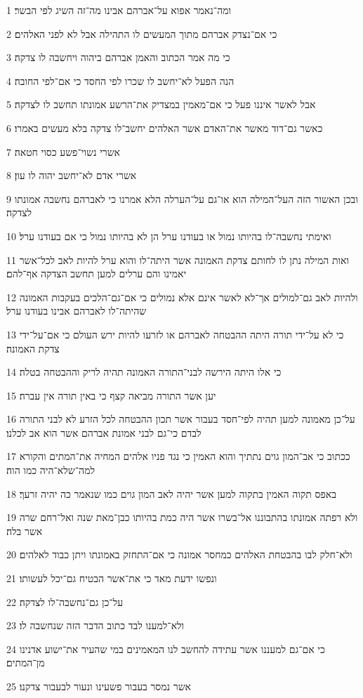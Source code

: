 \par 1 ומה־נאמר אפוא על־אברהם אבינו מה־זה השיג לפי הבשר׃
\par 2 כי אם־נצדק אברהם מתוך המעשים לו התהילה אבל לא לפני האלהים׃
\par 3 כי מה אמר הכתוב והאמן אברהם ביהוה ויחשבה לו צדקה׃
\par 4 הנה הפעל לא־יחשב לו שכרו לפי החסד כי אם־לפי החובה׃
\par 5 אבל לאשר איננו פעל כי אם־מאמין במצדיק את־הרשע אמונתו תחשב לו לצדקה׃
\par 6 כאשר גם־דוד מאשר את־האדם אשר האלהים יחשב־לו צדקה בלא מעשים באמרו׃
\par 7 אשרי נשוי־פשע כסוי חטאה׃
\par 8 אשרי אדם לא־יחשב יהוה לו עון׃
\par 9 ובכן האשור הזה העל־המילה הוא או־גם על־הערלה הלא אמרנו כי לאברהם נחשבה אמונתו לצדקה׃
\par 10 ואימתי נחשבה־לו בהיותו נמול או בעודנו ערל הן לא בהיותו נמול כי אם בעודנו ערל׃
\par 11 ואות המילה נתן לו לחותם צדקת האמונה אשר היתה־לו והוא ערל להיות לאב לכל־אשר יאמינו והם ערלים למען תחשב הצדקה אף־להם׃
\par 12 ולהיות לאב גם־למולים אך־לא לאשר אינם אלא נמולים כי אם־גם־הלכים בעקבות האמונה שהיתה־לו לאברהם אבינו בעודנו ערל׃
\par 13 כי לא על־ידי תורה היתה ההבטחה לאברהם או לזרעו להיות ירש העולם כי אם־על־ידי צדקת האמונה׃
\par 14 כי אלו היתה הירשה לבני־התורה האמונה תהיה לריק וההבטחה בטלה׃
\par 15 יען אשר התורה מביאה קצף כי באין תורה אין עברה׃
\par 16 על־כן מאמונה למען תהיה לפי־חסד בעבור אשר תכון ההבטחה לכל הזרע לא לבני התורה לבדם כי־גם לבני אמונת אברהם אשר הוא אב לכלנו׃
\par 17 ככתוב כי אב־המון גוים נתתיך והוא האמין כי נגד פניו אלהים המחיה את־המתים והקורא למה־שלא־היה כמו הוה׃
\par 18 באפס תקוה האמין בתקוה למען אשר יהיה לאב המון גוים כמו שנאמר כה יהיה זרעך׃
\par 19 ולא רפתה אמונתו בהתבוננו אל־בשרו אשר היה כמת בהיותו כבן־מאת שנה ואל־רחם שרה אשר בלה׃
\par 20 ולא־חלק לבו בהבטחת האלהים כמחסר אמונה כי אם־התחזק באמונתו ויתן כבוד לאלהים׃
\par 21 ונפשו ידעת מאד כי את־אשר הבטיח גם־יכל לעשותו׃
\par 22 על־כן גם־נחשבה־לו לצדקה׃
\par 23 ולא־למענו לבד כתוב הדבר הזה שנחשבה לו׃
\par 24 כי אם־גם למעננו אשר עתידה להחשב לנו המאמינים במי שהעיר את־ישוע אדנינו מן־המתים׃
\par 25 אשר נמסר בעבור פשעינו ונעור לבעבור צדקנו׃


